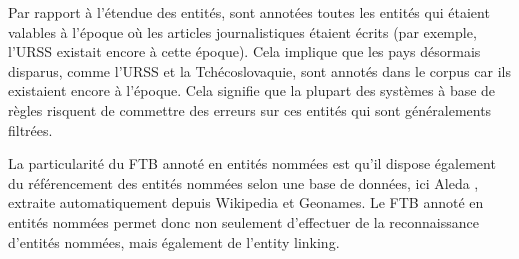 \documentclass[PhD-Yoann-Dupont.tex]{subfiles}
\begin{document}
Par rapport à l'étendue des entités, sont annotées toutes les entités qui étaient valables à l'époque où les articles journalistiques étaient écrits (par exemple, l'URSS existait encore à cette époque). Cela implique que les pays désormais disparus, comme l'URSS et la Tchécoslovaquie, sont annotés dans le corpus car ils existaient encore à l'époque. Cela signifie que la plupart des systèmes à base de règles risquent de commettre des erreurs sur ces entités qui sont généralements filtrées.

La particularité du FTB annoté en entités nommées est qu'il dispose également du référencement des entités nommées selon une base de données, ici Aleda \citep{sagot2012aleda}, extraite automatiquement depuis Wikipedia et Geonames. Le FTB annoté en entités nommées permet donc non seulement d'effectuer de la reconnaissance d'entités nommées, mais également de l'entity linking.
\end{document}
